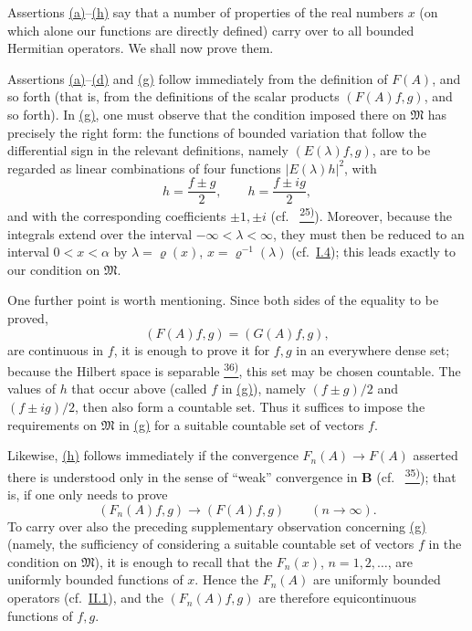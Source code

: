 \documentclass[12pt,b5paper,twoside]{article}
\newcommand{\noteref}[1]{%
  \hyperlink{note:#1}{\textsuperscript{#1)}}}
\begin{document}
Assertions \hyperref[prop:II.2.a]{(a)}--\hyperref[prop:II.2.h]{(h)}
say that a number of properties of the real numbers
\(x\) (on which alone our functions are directly defined) carry over to
all bounded Hermitian operators.  We shall now prove them.

Assertions \hyperref[prop:II.2.a]{(a)}--\hyperref[prop:II.2.d]{(d)} and
\hyperref[prop:II.2.g]{(g)} follow immediately from the definition of
\(F(A)\), and so forth (that is, from the definitions of the scalar
products \((F(A)f,g)\), and so forth).  In
\hyperref[prop:II.2.g]{(g)}, one must observe that the
condition imposed there on \(\mathfrak M\) has precisely the right form:
the functions of bounded variation that follow the differential sign in
the relevant definitions, namely \((E(\lambda)f,g)\), are to be regarded
as linear combinations of four functions \(|E(\lambda)h|^2\), with
\[
 h=\frac{f\pm g}{2},\qquad h=\frac{f\pm ig}{2},
\]
and with the corresponding coefficients \(\pm1,\pm i\) (cf.\
\noteref{25}).  Moreover, because the integrals extend over the interval
\(-\infty<\lambda<\infty\), they must then be reduced to an interval
\(0<x<\alpha\) by \(\lambda=\varrho(x)\), \(x=\varrho^{-1}(\lambda)\)
(cf.\ \hyperref[sec:I.4]{I.4}); this leads exactly to our condition on
\(\mathfrak M\).

One further point is worth mentioning.  Since both sides of the equality
to be proved,
\[
 (F(A)f,g)=(G(A)f,g),
\]
are continuous in \(f\), it is enough to prove it for \(f,g\) in an
everywhere dense set; because the Hilbert space is separable\noteref{36},
this set may be chosen countable.  The values of \(h\) that occur above
(called \(f\) in \hyperref[prop:II.2.g]{(g)}), namely
\((f\pm g)/2\) and \((f\pm ig)/2\), then
also form a countable set.  Thus it suffices to impose the requirements on
\(\mathfrak M\) in \hyperref[prop:II.2.g]{(g)} for a suitable countable
set of vectors \(f\).

Likewise, \hyperref[prop:II.2.h]{(h)} follows immediately if the convergence
\(F_n(A)\to F(A)\) asserted there is understood
only in the sense of ``weak'' convergence in \(\mathbf B\)
(cf.\ \noteref{35}); that is, if one only needs to prove
\[
 (F_n(A)f,g)\longrightarrow(F(A)f,g)
 \qquad(n\to\infty).
\]
To carry over also the preceding supplementary observation concerning
\hyperref[prop:II.2.g]{(g)}
(namely, the sufficiency of considering a suitable countable set of
vectors \(f\) in the condition on \(\mathfrak M\)), it is enough to recall
that the \(F_n(x)\), \(n=1,2,\ldots\), are uniformly bounded functions of
\(x\).  Hence the \(F_n(A)\) are uniformly bounded operators
(cf.\ \hyperref[sec:II.1]{II.1}), and the \((F_n(A)f,g)\) are therefore
equicontinuous functions of \(f,g\).
\end{document}
